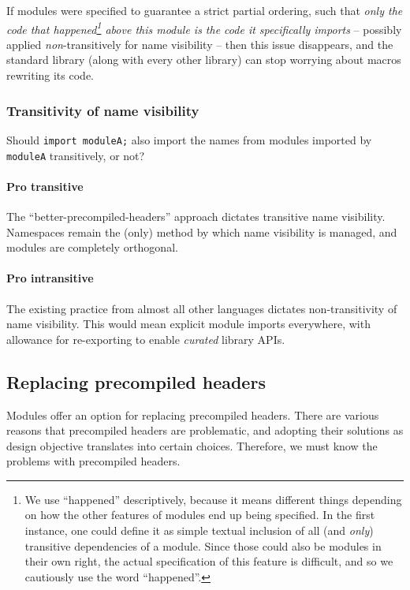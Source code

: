 \documentclass[reqno]{article}
\begin{document}
If modules were specified to guarantee a strict partial ordering, such that
\emph{only the code that happened\footnote{We use ``happened'' descriptively,
because it means different things depending on how the other features of
modules end up being specified. In the first instance, one could define it as
simple textual inclusion of all (and \emph{only}) transitive dependencies of a
module. Since those could also be modules in their own right, the actual
specification of this feature is difficult, and so we cautiously use the word
``happened''.} above this module is the code it specifically imports} --
possibly applied \emph{non}-transitively for name visibility -- then this issue
disappears, and the standard library (along with every other library) can stop
worrying about macros rewriting its code.

\subsubsection{Transitivity of name visibility}

Should \texttt{import moduleA;} also import the names from modules imported by
\texttt{moduleA} transitively, or not?

\paragraph{Pro transitive}

The ``better-precompiled-headers'' approach dictates transitive name
visibility. Namespaces remain the (only) method by which name visibility is
managed, and modules are completely orthogonal.

\paragraph{Pro intransitive}

The existing practice from almost all other languages dictates non-transitivity
of name visibility. This would mean explicit module imports everywhere, with
allowance for re-exporting to enable \emph{curated} library APIs.


\subsection{Replacing precompiled headers}
Modules offer an option for replacing precompiled headers. There are various
reasons that precompiled headers are problematic, and adopting their solutions
as design objective translates into certain choices. Therefore, we must know the
problems with precompiled headers.
\end{document}
